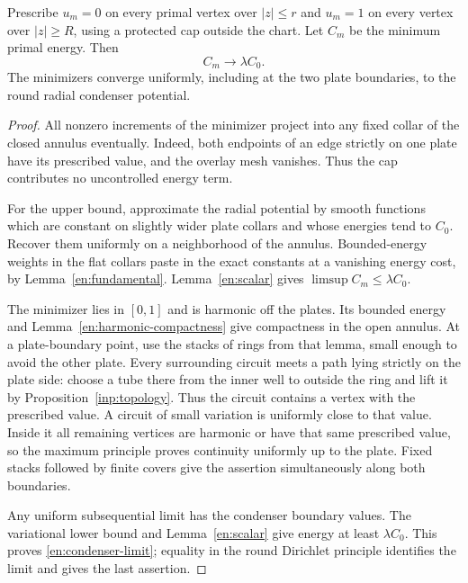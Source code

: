 \begin{lemma}\label{en:condenser}
Prescribe $u_m=0$ on every primal vertex over $|z|\le r$ and $u_m=1$
on every vertex over $|z|\ge R$, using a protected cap outside the chart.
Let $C_m$ be the minimum primal energy.  Then
\begin{equation}\label{en:condenser-limit}
                             C_m\longrightarrow\lambda C_0.
\end{equation}
The minimizers converge uniformly, including at the two plate
boundaries, to the round radial condenser potential.
\end{lemma}

\begin{proof}
All nonzero increments of the minimizer project into any fixed collar
of the closed annulus eventually.  Indeed, both endpoints of an edge
strictly on one plate have its prescribed value, and the overlay mesh
vanishes.  Thus the cap contributes no uncontrolled energy term.

For the upper bound, approximate the radial potential by smooth
functions which are constant on slightly wider plate collars and whose
energies tend to $C_0$.  Recover them uniformly on a neighborhood of the
annulus.  Bounded-energy weights in the flat collars paste in the exact
constants at a vanishing energy cost, by
Lemma~\ref{en:fundamental}.  Lemma~\ref{en:scalar} gives
$\limsup C_m\le\lambda C_0$.

The minimizer lies in $[0,1]$ and is harmonic off the plates.  Its bounded
energy and Lemma~\ref{en:harmonic-compactness} give compactness in the
open annulus.  At a plate-boundary point, use the stacks of rings from
that lemma, small enough to avoid the other plate.  Every surrounding
circuit meets a path lying strictly on the plate side: choose a tube
there from the inner well to outside the ring and lift it by
Proposition~\ref{inp:topology}.  Thus the circuit contains a vertex
with the prescribed value.  A circuit of small variation is uniformly
close to that value.  Inside it all remaining vertices are harmonic or
have that same prescribed value, so the maximum principle proves
continuity uniformly up to the plate.  Fixed stacks followed by finite
covers give the assertion simultaneously along both boundaries.

Any uniform subsequential limit has the condenser boundary values.
The variational lower bound and Lemma~\ref{en:scalar} give energy at
least $\lambda C_0$.  This proves \eqref{en:condenser-limit}; equality
in the round Dirichlet principle identifies the limit and gives the
last assertion.
\end{proof}

